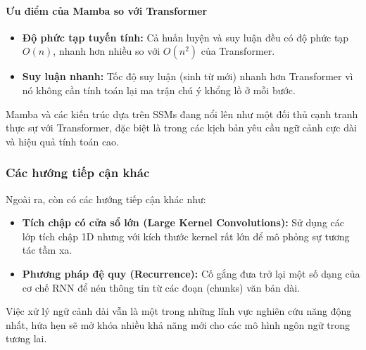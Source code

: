 \paragraph{Ưu điểm của Mamba so với Transformer}
\begin{itemize}
    \item \textbf{Độ phức tạp tuyến tính:} Cả huấn luyện và suy luận đều có độ phức tạp $O(n)$, nhanh hơn nhiều so với $O(n^2)$ của Transformer.
    \item \textbf{Suy luận nhanh:} Tốc độ suy luận (sinh từ mới) nhanh hơn Transformer vì nó không cần tính toán lại ma trận chú ý khổng lồ ở mỗi bước.
\end{itemize}
Mamba và các kiến trúc dựa trên SSMs đang nổi lên như một đối thủ cạnh tranh thực sự với Transformer, đặc biệt là trong các kịch bản yêu cầu ngữ cảnh cực dài và hiệu quả tính toán cao.

\subsubsection{Các hướng tiếp cận khác}
Ngoài ra, còn có các hướng tiếp cận khác như:
\begin{itemize}
    \item \textbf{Tích chập có cửa sổ lớn (Large Kernel Convolutions):} Sử dụng các lớp tích chập 1D nhưng với kích thước kernel rất lớn để mô phỏng sự tương tác tầm xa.
    \item \textbf{Phương pháp đệ quy (Recurrence):} Cố gắng đưa trở lại một số dạng của cơ chế RNN để nén thông tin từ các đoạn (chunks) văn bản dài.
\end{itemize}

Việc xử lý ngữ cảnh dài vẫn là một trong những lĩnh vực nghiên cứu năng động nhất, hứa hẹn sẽ mở khóa nhiều khả năng mới cho các mô hình ngôn ngữ trong tương lai.